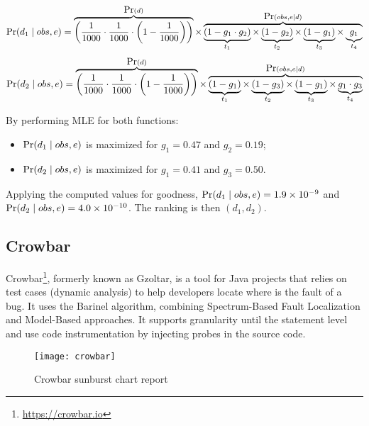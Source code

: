 \begin{description}
\begin{equation}
    \mbox{Pr}(d_1 \mid obs,e) =
    \overbrace{\bigg(\frac{1}{1000} \cdot \frac{1}{1000} \cdot \bigg(1 - \frac{1}{1000}\bigg)\bigg)}^{\mbox{Pr}(d)}
    \times
    \overbrace{
      \underbrace{(1-g_1 \cdot g_2)}_{t_1}
      \times
      \underbrace{(1-g_2)}_{t_2}
      \times
      \underbrace{(1-g_1)}_{t_3}
      \times
      \underbrace{g_1}_{t_4}
    }^{\mbox{Pr}(obs,e \mid d)}
\end{equation}
%
\begin{equation}
    \mbox{Pr}(d_2 \mid obs,e) =
    \overbrace{\bigg(\frac{1}{1000} \cdot \frac{1}{1000} \cdot \bigg(1 - \frac{1}{1000}\bigg)\bigg)}^{\mbox{Pr}(d)}
    \times
    \overbrace{
      \underbrace{(1-g_1)}_{t_1}
      \times
      \underbrace{(1-g_3)}_{t_2}
      \times
      \underbrace{(1-g_1)}_{t_3}
      \times
      \underbrace{g_1 \cdot g_3}_{t_4}
    }^{\mbox{Pr}(obs,e \mid d)}
\end{equation}
\end{description}

By performing MLE for both functions:
\begin{itemize}
\item $\mbox{Pr}(d_1 \mid obs,e)$ is maximized for $g_1=0.47$ and $g_2=0.19$;
\item $\mbox{Pr}(d_2 \mid obs,e)$ is maximized for $g_1=0.41$ and $g_3=0.50$.
\end{itemize}

Applying the computed values for goodness, $\mbox{Pr}(d_1 \mid obs,e)=1.9 \times
10^{-9}$ and $\mbox{Pr}(d_2 \mid obs,e)=4.0 \times 10^{-10}$. The ranking is then
$(d_1,d_2)$.


\subsection{Crowbar}
Crowbar\footnote{\url{https://crowbar.io}}, formerly known as Gzoltar, is a tool
for Java projects that relies on test cases (dynamic analysis) to help
developers locate where is the fault of a bug. It uses the Barinel algorithm,
combining Spectrum-Based Fault Localization and Model-Based approaches. It
supports granularity until the statement level and use code instrumentation by
injecting probes in the source code.

\begin{figure}[H]
    \begin{center}
        \texttt{[image: crowbar]}
        \caption{Crowbar sunburst chart report}
        \label{figure:crowbar_report}
    \end{center}
\end{figure}

